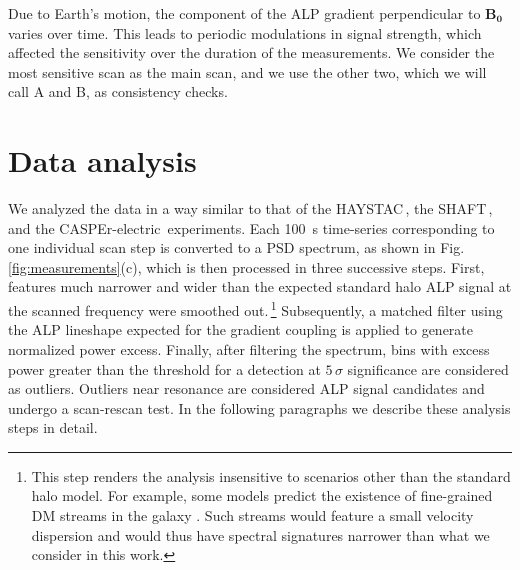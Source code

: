 \documentclass[superscriptaddress,
floatfix,
reprint,
nofootinbib,
amsmath,amssymb,
aps,
prd,
]{revtex4-2}
\begin{document}
Due to Earth's motion, the component of the ALP gradient perpendicular to $\mathbf{B_0}$ varies over time.
This leads to periodic modulations in signal strength, which affected the sensitivity over the duration of the measurements.
We consider the most sensitive scan as the main scan, and we use the other two, which we will call A and B, as consistency checks.


\section{Data analysis}

We analyzed the data in a way similar to that of the HAYSTAC\,\cite{Brubaker2017_HAYSTAC}, the SHAFT\,\cite{Gramolin2021_Ferromagnetic}, and the CASPEr-electric\,\cite{aybas2021_SolidStateNMR} experiments.
Each \SI{100}{\s} time-series corresponding to one individual scan step is converted to a PSD spectrum, as shown in Fig.\,\ref{fig:measurements}(c), which is then processed in three successive steps. 
First, features much narrower and wider than the expected standard halo ALP signal at the scanned frequency were smoothed out.\,\footnote{This step renders the analysis insensitive to scenarios other than the standard halo model. 
For example, some models predict the existence of fine-grained DM streams in the galaxy \cite{Arza:2022dng, MiniclusterStreamsOHare, DALIstreams}. 
Such streams would feature a small velocity dispersion and would thus have spectral signatures narrower than what we consider in this work.} 
Subsequently, a matched filter using the ALP lineshape expected for the gradient coupling is applied to generate normalized power excess.
Finally, after filtering the spectrum, bins with excess power greater than the threshold for a detection at $5\,\sigma$ significance are considered as outliers. 
Outliers near resonance are considered ALP signal candidates and undergo a scan-rescan test. 
In the following paragraphs we describe these analysis steps in detail. 
\end{document}
